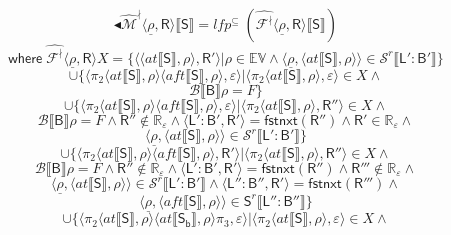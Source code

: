 $$\blacktriangleleft\mathcal{\hat{M}^\nmid} \langle \underline{\rho}, \mathsf{R} \rangle \llbracket \mathsf{S} \rrbracket = lfp^\subseteq \; (\mathcal{\hat{F^\nmid}} \langle \underline{\rho}, \mathsf{R} \rangle \llbracket \mathsf{S} \rrbracket)$$
$$\mathsf{where} \;  \mathcal{\hat{F^\nmid}} \langle \underline{\rho}, \mathsf{R} \rangle X = \{ \langle \langle at \llbracket \mathsf{S} \rrbracket , \rho \rangle , \mathsf{R'} \rangle | \rho \in \mathbb{EV} \land \langle \underline{\rho}, \langle at \llbracket \mathsf{S} \rrbracket , \rho \rangle \rangle \in \mathcal{S}^r \llbracket \mathsf{L':B'} \rrbracket \}$$
$$\cup \{\langle \pi_2 \langle at \llbracket \mathsf{S} \rrbracket , \rho \rangle \langle aft \llbracket \mathsf{S}\rrbracket , \rho \rangle , \varepsilon \rangle | \langle \pi_2 \langle at \llbracket \mathsf{S} \rrbracket , \rho \rangle , \varepsilon \rangle \in X \land$$
$$\mathcal{B}\llbracket \mathsf{B} \rrbracket \rho = \mathit{F} \}$$
$$\cup \{ \langle \pi_2 \langle at \llbracket \mathsf{S} \rrbracket , \rho \rangle \langle aft \llbracket \mathsf{S} \rrbracket , \rho \rangle , \varepsilon \rangle | \langle \pi_2 \langle at \llbracket \mathsf{S} \rrbracket , \rho \rangle , \mathsf{R''} \rangle \in X \land $$
$$\mathcal{B}\llbracket \mathsf{B} \rrbracket \rho = \mathit{F} \land \mathsf{R''} \notin \mathbb{R_\varepsilon} \land \langle \mathsf{L':B',R'} \rangle = \mathsf{fstnxt(R'')} \land \mathsf{R'} \in \mathbb{R_\varepsilon} \land$$
$$\langle \underline{\rho} ,\langle at \llbracket \mathsf{S} \rrbracket , \rho \rangle \rangle \in \mathcal{S}^r \llbracket \mathsf{L':B'} \rrbracket\}$$
$$\cup \{\langle \pi_2 \langle at \llbracket \mathsf{S} \rrbracket , \rho \rangle \langle aft \llbracket \mathsf{S}\rrbracket , \rho \rangle , \mathsf{R'} \rangle | \langle \pi_2 \langle at \llbracket \mathsf{S} \rrbracket , \rho \rangle , \mathsf{R''} \rangle \in X \land$$
$$\mathcal{B}\llbracket \mathsf{B} \rrbracket \rho = \mathit{F} \land \mathsf{R''} \notin \mathbb{R_\varepsilon} \land \langle \mathsf{L':B',R'} \rangle = \mathsf{fstnxt(R'')} \land \mathsf{R'''} \notin \mathbb{R_\varepsilon} \land$$
$$\langle \underline{\rho}, \langle at \llbracket \mathsf{S} \rrbracket , \rho \rangle \rangle \in \mathcal{S}^r \llbracket \mathsf{L':B'} \rrbracket \land \langle \mathsf{L'':B'' , R'} \rangle = \mathsf{fstnxt(R''')} \land$$
$$\langle \underline{\rho}, \langle aft \llbracket \mathsf{S} \rrbracket , \rho \rangle \rangle \in \mathsf{S}^r \llbracket \mathsf{L'':B''} \rrbracket \}$$
$$\cup \{\langle \pi_2 \langle at \llbracket \mathsf{S} \rrbracket , \rho \rangle \langle at \llbracket \mathsf{S_b} \rrbracket , \rho \rangle \pi_3, \varepsilon \rangle | \langle \pi_2 \langle at \llbracket \mathsf{S} \rrbracket , \rho \rangle , \varepsilon \rangle \in X \land$$
